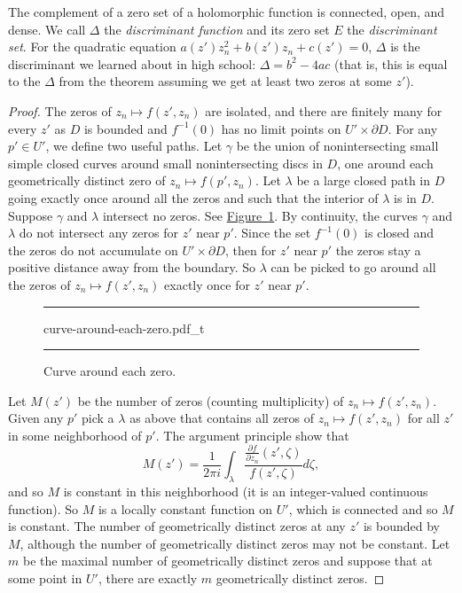 \documentclass[12pt,openany]{book}
\newcommand{\myindex}[1]{#1\index{#1}}
\theoremstyle{plain}
\theoremstyle{remark}
\theoremstyle{definition}
\newenvironment{myfig}{%
\begin{figure}[h!t]
\noindent\rule{\textwidth}{0.5pt}\vspace{12pt}\par\centering}%
{\par\noindent\rule{\textwidth}{0.5pt}
\end{figure}}
\theoremstyle{exercise}
\theoremstyle{example}
\newcommand{\figureref}[1]{\hyperref[#1]{Figure~\ref*{#1}}}
\begin{document}
The complement of a zero set of a holomorphic function is connected,
open, and dense.
We call $\Delta$ the \emph{\myindex{discriminant function}} and its zero set
$E$ the \emph{\myindex{discriminant set}}.
For the quadratic equation $a(z') z_n^2 + b(z') z_n + c(z') = 0$,
$\Delta$ is the discriminant we learned about in high school:
$\Delta = b^2-4ac$ (that is, this is equal to the $\Delta$
from the theorem assuming we get at least two zeros at some $z'$).

\begin{proof}
The zeros of $z_n \mapsto f(z',z_n)$ are isolated, and there are finitely
many for every $z'$ as $D$ is bounded and $f^{-1}(0)$ has no limit points on
$U' \times \partial D$.
For any $p' \in U'$, we define two useful paths.
Let $\gamma$ be the union of nonintersecting
small simple closed curves around small nonintersecting discs
in $D$, one around each geometrically distinct zero of $z_n \mapsto f(p',z_n)$.
Let $\lambda$ be a large closed path in $D$ going
exactly once around all the zeros and such that the interior of $\lambda$ is
in $D$.
Suppose $\gamma$ and $\lambda$ intersect no zeros.
See \figureref{fig:curve-around-each-zero}.
By continuity, the curves $\gamma$
and $\lambda$ do not intersect any zeros for $z'$ near $p'$.
Since the set $f^{-1}(0)$ is closed and the zeros
do not
accumulate on $U' \times \partial D$,
then
for $z'$ near $p'$ the zeros stay a positive distance away from
the boundary.  So $\lambda$ can be picked to go
around all the zeros of $z_n \mapsto f(z',z_n)$ exactly once for $z'$ near $p'$.

\begin{myfig}
{curve-around-each-zero.pdf_t}
\caption{Curve around each zero.\label{fig:curve-around-each-zero}}
\end{myfig}

Let $M(z')$ be the number of zeros (counting multiplicity) of 
$z_n \mapsto f(z',z_n)$.
Given any $p'$
pick a $\lambda$ as above that contains all zeros
of $z_n \mapsto f(z',z_n)$ for all $z'$ in some neighborhood of $p'$.
The argument principle show that
\begin{equation*}
M(z') = \frac{1}{2\pi i}
\int_{\lambda}
\frac{\frac{\partial f}{\partial z_n}(z',\zeta)}{f(z',\zeta)} d\zeta ,
\end{equation*}
and so $M$ is constant in this neighborhood (it is an integer-valued
continuous function).
So $M$ is a locally constant function on $U'$,
which is connected and so $M$ is constant.
The number of
geometrically distinct zeros at any $z'$ is bounded by $M$,
although the number of geometrically distinct zeros may not be constant.
Let $m$ be the maximal
number of geometrically distinct zeros and suppose that at some point
in $U'$, there are exactly $m$ geometrically distinct zeros.


\end{proof}
\end{document}
